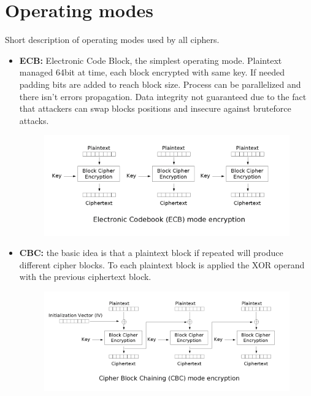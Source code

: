 \documentclass[11pt,a4paper]{article}
\begin{document}
\section{Operating modes}
Short description of operating modes used by all ciphers.
\begin{itemize}
    \item \textbf{ECB:} Electronic Code Block, the simplest operating mode. Plaintext managed 64bit at time, each block encrypted with same key. If needed padding bits are added to reach block size. Process can be parallelized and there isn't errors propagation. Data integrity not guaranteed due to the fact that attackers can swap blocks positions and insecure against bruteforce attacks.
    \begin{figure}[H]
        \centering
            \includegraphics[width=\textwidth]{ecb-hw1-1649359.png}
    \end{figure}
    \item \textbf{CBC:} the basic idea is that a plaintext block if repeated will produce different cipher blocks. To each plaintext block is applied the XOR operand with the previous ciphertext block.
    \begin{figure}[H]
        \centering
            \includegraphics[width=\textwidth]{cbc-hw1-1649359.png}
    \end{figure}
\end{itemize}

\clearpage
\end{document}
